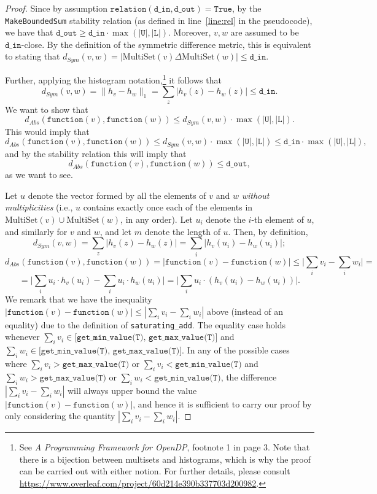 \documentclass[11pt,a4paper]{article}
\theoremstyle{definition}
\newcommand{\MultiSet}{\mathrm{MultiSet}}
\newcommand{\din}{\texttt{d\_in}}
\newcommand{\dout}{\texttt{d\_out}}
\newcommand{\Relation}{\texttt{relation}}
\newcommand{\True}{\texttt{True}}
\newcommand{\function}{\texttt{function}}
\begin{document}
\begin{proof}
    Since by assumption $\Relation(\din, \dout) = \True$, by the \texttt{MakeBoundedSum} stability relation (as defined in line~\ref{line:rel} in the pseudocode), we have that $\dout \geq \din \cdot \max{(|\texttt{U}|, |\texttt{L}|)}$. Moreover, $v, w$ are assumed to be $\din$-close. By the definition of the symmetric difference metric, this is equivalent to stating that $d_{Sym}(v, w) = |\MultiSet(v) \Delta \MultiSet(w)| \leq \din$.

    Further, applying the histogram notation,\footnote{See \textit{A Programming Framework for OpenDP}, footnote 1 in page 3. Note that there is a bijection between multisets and histograms, which is why the proof can be carried out with either notion. For further details, please consult \url{https://www.overleaf.com/project/60d214e390b337703d200982}.}  it follows that
    \[
        d_{Sym}(v, w) = \lVert h_{v} - h_{w}\rVert_1 = \sum_z |h_v(z) - h_w(z)| \leq \din.
    \]
    We want to show that
    \[
        d_{Abs}(\function(v), \function(w)) \leq d_{Sym}(v, w) \cdot \max{(|\texttt{U}|, |\texttt{L}|)}.
    \]
    This would imply that
    \[
        d_{Abs}(\function(v), \function(w)) \leq d_{Sym}(v, w) \cdot \max{(|\texttt{U}|, |\texttt{L}|)} \leq \din \cdot \max{(|\texttt{U}|, |\texttt{L}|)},
    \]
    and by the stability relation this will imply that
    \[
        d_{Abs}(\function(v), \function(w)) \leq \dout,
    \]
    as we want to see. 

Let $u$ denote the vector formed by all the elements of $v$ and $w$ \textit{without multiplicities} (i.e., $u$ contains exactly once each of the elements in $\MultiSet(v) \cup \MultiSet(w)$, in any order). Let $u_i$ denote the $i$-th element of $u$, and similarly for $v$ and $w$, and let $m$ denote the length of $u$.  
Then, by definition,
\[
    d_{Sym}(v, w) = \sum_z \Big|h_v(z) - h_w(z)\Big| = \sum_i \Big|h_v(u_i) - h_w(u_i)\Big|;
\]
\[
    d_{Abs}(\function(v), \function(w)) = |\function(v) - \function(w)| \leq \Big|\sum_i v_i - \sum_i w_i\Big| = 
\]
\[
   = \Big|\sum_i u_i \cdot h_v(u_i) - \sum_i u_i \cdot h_w(u_i)\Big| = \Big|\sum_i u_i \cdot (h_v(u_i) - h_w(u_i))\Big|.
\]
We remark that we have the inequality $|\function(v) - \function(w)| \leq |\sum_i v_i - \sum_i w_i|$ above (instead of an equality) due to the definition of \texttt{saturating\_add}. The equality case holds whenever $\sum_i v_i \in \texttt{[get\_min\_value(T), get\_max\_value(T)]}$ and $\sum_i w_i \in \texttt{[get\_min\_value(T),}$  $\texttt{get\_max\_value(T)]}$. In any of the possible cases where $\sum_i v_i > \texttt{get\_max\_value(T)}$ or $\sum_i v_i < \texttt{get\_min\_value(T)}$ and $\sum_i w_i > \texttt{get\_max\_value(T)}$ or $\sum_i w_i < \texttt{get\_min\_value(T)}$, the difference $|\sum_i v_i - \sum_i w_i|$ will always upper bound the value $|\function(v) - \function(w)|$, and hence it is sufficient to carry our proof by only considering the quantity $|\sum_i v_i - \sum_i w_i|$.


\end{proof}
\end{document}
